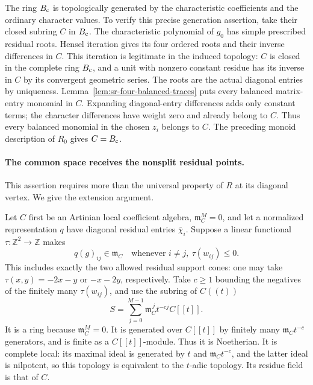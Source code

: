 The ring \(B_{\rm c}\) is topologically generated by the
characteristic coefficients and the ordinary character
values. To verify this precise generation assertion, take
their closed subring \(C\) in \(B_{\rm c}\).
The characteristic polynomial of \(g_0\) has simple prescribed
residual roots. Hensel iteration gives its four ordered
roots and their inverse differences in \(C\).
This iteration is legitimate in the induced topology:
\(C\) is closed in the complete ring \(B_{\rm c}\), and a
unit with nonzero constant residue has its inverse in \(C\)
by its convergent geometric series.
The roots are the actual diagonal entries by uniqueness.
Lemma~\ref{lem:sr-four-balanced-traces} puts every balanced
matrix-entry monomial in \(C\).
Expanding diagonal-entry differences adds only constant terms;
the character differences have weight zero and already
belong to \(C\).
Thus every balanced monomial in the chosen \(z_i\) belongs
to \(C\). The preceding monoid description of \(R_0\)
gives \(C=B_{\rm c}\).

\paragraph{The common space receives the nonsplit residual points.}
This assertion requires more than the universal property of \(R\)
at its diagonal vertex. We give the extension argument.

Let \(C\) first be an Artinian local coefficient algebra,
\(\mathfrak m_C^M=0\), and let a normalized representation
\(q\) have diagonal residual entries \(\bar\chi_i\).
Suppose a linear functional
\(\tau:\mathbb Z^2\to\mathbb Z\) makes
\[
 q(g)_{ij}\in\mathfrak m_C
       \quad\text{whenever }i\ne j,\ \tau(w_{ij})\le0.
                                                        \tag{R4S3}
\]
This includes exactly the two allowed residual support cones:
one may take \(\tau(x,y)=-2x-y\) or \(-x-2y\),
respectively.
Take \(c\ge1\) bounding the negatives of the finitely many
\(\tau(w_{ij})\), and use the subring of \(C((t))\)
\[
 S=\sum_{j=0}^{M-1}
             \mathfrak m_C^{\,j}t^{-cj}C[[t]].             \tag{R4S4}
\]
It is a ring because \(\mathfrak m_C^M=0\).
It is generated over \(C[[t]]\) by finitely many
\(\mathfrak m_Ct^{-c}\) generators, and is finite as a
\(C[[t]]\)-module. Thus it is Noetherian.
It is complete local: its maximal ideal is generated by
\(t\) and \(\mathfrak m_Ct^{-c}\), and the latter ideal
is nilpotent, so this topology is equivalent to the
\(t\)-adic topology. Its residue field is that of \(C\).

